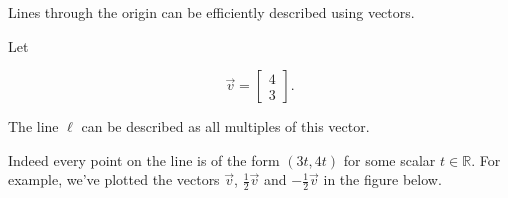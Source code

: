 Lines through the origin can be efficiently described using vectors.

Let

$$
\vec v=
\begin{bmatrix}
4\\
3
\end{bmatrix}.
$$

The line $\ell$ can be described as all multiples of this vector.


Indeed every point on the line is of the form $(3t,4t)$ for some scalar $t \in \mathbb{R}$. For example, we've plotted the vectors $\vec{v}$, $\frac{1}{2}\vec{v}$ and 
$-\frac{1}{2}\vec{v}$
in the figure below.  




